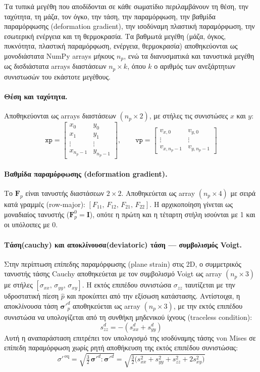 \documentclass[12pt,a4paper]{report}
\begin{document}
	Τα τυπικά μεγέθη που αποδίδονται σε κάθε σωματίδιο περιλαμβάνουν τη θέση, την ταχύτητα, τη μάζα, τον όγκο, την τάση, την παραμόρφωση, την βαθμίδα παραμόρφωσης (deformation gradient), την ισοδύναμη πλαστική παραμόρφωση, την εσωτερική ενέργεια και τη θερμοκρασία. Τα βαθμωτά μεγέθη (μάζα, όγκος, πυκνότητα, πλαστική παραμόρφωση, ενέργεια, θερμοκρασία) αποθηκεύονται ως μονοδιάστατα NumPy arrays μήκους $n_p$, ενώ τα διανυσματικά και τανυστικά μεγέθη ως δισδιάστατα arrays διαστάσεων $n_p \times k$, όπου $k$ ο αριθμός των ανεξάρτητων συνιστωσών του εκάστοτε μεγέθους.

	\paragraph{Θέση και ταχύτητα.} Αποθηκεύονται ως arrays διαστάσεων $(n_p \times 2)$, με στήλες τις συνιστώσες $x$ και $y$:
	\[
	\texttt{xp} =
	\begin{bmatrix}
		x_0 & y_0 \\
		x_1 & y_1 \\
		\vdots & \vdots \\
		x_{n_p-1} & y_{n_p-1}
	\end{bmatrix}, \qquad
	\texttt{vp} =
	\begin{bmatrix}
		v_{x,0} & v_{y,0} \\
		\vdots & \vdots \\
		v_{x,n_p-1} & v_{y,n_p-1}
	\end{bmatrix}
	\]

	\paragraph{Βαθμίδα παραμόρφωσης (deformation gradient).} Το $\mathbf{F}_p$ είναι τανυστής διαστάσεων $2\times 2$. Αποθηκεύεται ως array $(n_p \times 4)$ με σειρά κατά γραμμές (row-major): $[F_{11},\,F_{12},\,F_{21},\,F_{22}]$. Η αρχικοποίηση γίνεται ως μοναδιαίος τανυστής ($\mathbf{F}_p^0 = \mathbf{I}$), οπότε η πρώτη και η τέταρτη στήλη ισούνται με 1 και οι υπόλοιπες με 0.

	\paragraph{Τάση(cauchy) και αποκλίνουσα(deviatoric) τάση — συμβολισμός Voigt.} Στην περίπτωση επίπεδης παραμόρφωσης (plane strain) στις 2D, ο συμμετρικός τανυστής τάσης Cauchy αποθηκεύεται με τον συμβολισμό Voigt ως array $(n_p \times 3)$ με στήλες $[\sigma_{xx},\, \sigma_{yy},\, \sigma_{xy}]$. Η εκτός επιπέδου συνιστώσα $\sigma_{zz}$ ταυτίζεται με την υδροστατική πίεση $\hat{p}$ και προκύπτει από την εξίσωση κατάστασης. Αντίστοιχα, η αποκλίνουσα τάση ${\boldsymbol{\sigma}'}^d_p$ αποθηκεύεται ως array $(n_p \times 3)$, με την εκτός επιπέδου συνιστώσα να υπολογίζεται από τη συνθήκη μηδενικού ίχνους (traceless condition):
	\[
	s_{zz}^d = -(s_{xx}^d + s_{yy}^d)
	\]
	Αυτή η αναπαράσταση επιτρέπει τον υπολογισμό της ισοδύναμης τάσης von Mises σε επίπεδη παραμόρφωση χωρίς ρητή αποθήκευση της εκτός επιπέδου συνιστώσας:
	\[
	\sigma'^{\,\mathrm{eq}} = \sqrt{\tfrac{3}{2}\,{\boldsymbol{\sigma}'}^d : {\boldsymbol{\sigma}'}^d}
	= \sqrt{\tfrac{3}{2}\bigl(s_{xx}^2 + s_{yy}^2 + s_{zz}^2 + 2s_{xy}^2\bigr)}
	\]
\end{document}
